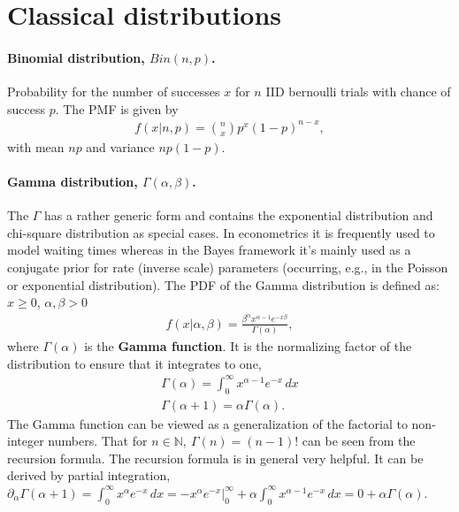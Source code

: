 

\section{Classical distributions}

\paragraph*{Binomial distribution, $Bin(n,p)$.} Probability for the number of successes $x$ for $n$ IID bernoulli trials with chance of success $p$. The PMF is given by
\begin{align}
f(x|n,p) =  \binom {n} {x} p^x (1-p)^{n-x},
\end{align}
with mean $np$ and variance $np(1-p)$. \\

\paragraph*{Gamma distribution, $\Gamma(\alpha, \beta)$.} 
The $\Gamma$ has a rather generic form and contains the exponential distribution and chi-square distribution as special cases. In econometrics it is frequently used to model waiting times whereas in the Bayes framework it's mainly used as a conjugate prior for rate (inverse scale) parameters (occurring, e.g., in the Poisson or exponential distribution).
The PDF of the  Gamma distribution is defined as: $x\geq0$, $\alpha, \beta > 0$
\begin{align}\label{gamma_distri}
 f(x|\alpha,\beta) = 
 \frac{\beta^\alpha x^{\alpha -1} e^{-x\beta}}{\Gamma(\alpha)},
\end{align}
where $\Gamma(\alpha)$ is the \textbf{Gamma function}. It is the normalizing factor of the distribution to ensure that it integrates to one,
\begin{align}\label{gamma_function}
\Gamma(\alpha) = \int_0 ^\infty x^{\alpha -1} e^{-x}\, dx \\
\Gamma(\alpha + 1) = \alpha \Gamma(\alpha).
\end{align}
The Gamma function can be viewed as a generalization of the factorial to non-integer numbers. That for $n\in  \mathbb N, ~ \Gamma(n) = (n-1)!$ can be seen from the recursion formula. The recursion formula is in general very helpful. It can be derived by partial integration, 
$\partial_\alpha \Gamma(\alpha+1) = \int_0^\infty x^{\alpha}e^{-x}\, dx 
= -x^{\alpha}e^{-x}  \Big|_0^\infty +\alpha \int_0^\infty x^{\alpha-1}e^{-x}\,dx = 0 + \alpha\Gamma(\alpha)$.

